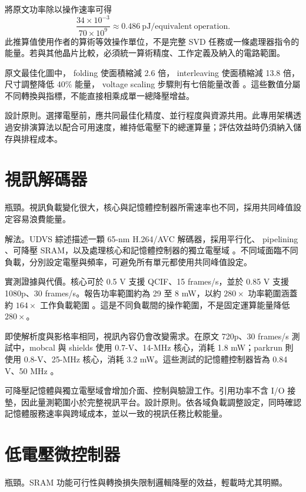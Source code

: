 將原文功率除以操作速率可得
\begin{equation}
\frac{34\times10^{-3}}{70\times10^9}
\approx0.486\ \mathrm{pJ/equivalent\ operation}.
\end{equation}
此推算值使用作者的算術等效操作單位，不是完整 SVD 任務或一條處理器指令的能量。若與其他晶片比較，必須統一算術精度、工作定義及納入的電路範圍。

原文最佳化圖中， folding 使面積縮減 2.6 倍， interleaving 使面積縮減 13.8 倍，尺寸調整降低 40\% 能量， voltage scaling 步驟則有七倍能量改善 \cite[Fig.~22]{markovic2010}。這些數值分屬不同轉換與指標，不能直接相乘成單一總降壓增益。

\textnormal{設計原則。}選擇電壓前，應共同最佳化精度、並行程度與資源共用。此專用架構透過安排演算法以配合可用速度，維持低電壓下的總運算量；評估效益時仍須納入儲存與排程成本。

\section{視訊解碼器}
\textnormal{瓶頸。}視訊負載變化很大，核心與記憶體控制器所需速率也不同，採用共同峰值設定容易浪費能量。

\textnormal{解法。}UDVS 綜述描述一顆 65-nm H.264/AVC 解碼器，採用平行化、 pipelining 、可降壓 SRAM，以及處理核心和記憶體控制器的獨立電壓域 \cite[Sec.~VI-A]{udvs2010}。不同域面臨不同負載，分別設定電壓與頻率，可避免所有單元都使用共同峰值設定。

\textnormal{實測證據與代價。}核心可於 0.5 V 支援 QCIF、15 frames/s，並於 0.85 V 支援 1080p、30 frames/s。報告功率範圍約為 29 \uW{} 至 8 mW，以約 $280\times$ 功率範圍涵蓋約 $164\times$ 工作負載範圍 \cite[p.~207]{udvs2010}。這是不同負載間的操作範圍，不是固定運算能量降低 $280\times$。

即使解析度與影格率相同，視訊內容仍會改變需求。在原文 720p、30 frames/s 測試中，mobcal 與 shields 使用 0.7-V、14-MHz 核心，消耗 1.8 mW；parkrun 則使用 0.8-V、25-MHz 核心，消耗 3.2 mW。這些測試的記憶體控制器皆為 0.84 V、50 MHz \cite[Table~2]{udvs2010}。

可降壓記憶體與獨立電壓域會增加介面、控制與驗證工作。引用功率不含 I/O 接墊，因此量測範圍小於完整視訊平台。\textnormal{設計原則。}依各域負載調整設定，同時確認記憶體服務速率與跨域成本，並以一致的視訊任務比較能量。

\section{低電壓微控制器}
\textnormal{瓶頸。}SRAM 功能可行性與轉換損失限制邏輯降壓的效益，輕載時尤其明顯。

